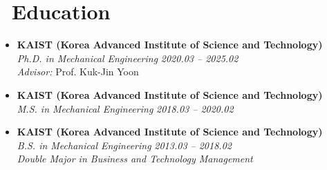 \documentclass[a4paper,11pt]{article}
\begin{document}
\section{\faUniversity\ Education}
\begin{itemize}[leftmargin=0.25cm]

\item \textbf{KAIST (Korea Advanced Institute of Science and Technology)} \\
\textit{Ph.D. in Mechanical Engineering} \hfill \textit{2020.03 -- 2025.02}\\
\textit{Advisor:} Prof. Kuk-Jin Yoon

\item \textbf{KAIST (Korea Advanced Institute of Science and Technology)}\\
\textit{M.S. in Mechanical Engineering} \hfill \textit{2018.03 -- 2020.02} \\

\item \textbf{KAIST (Korea Advanced Institute of Science and Technology)}\\
\textit{B.S. in Mechanical Engineering}  \hfill \textit{2013.03 -- 2018.02}\\
\textit{Double Major in Business and Technology Management} \\

\end{itemize}

\end{document}
